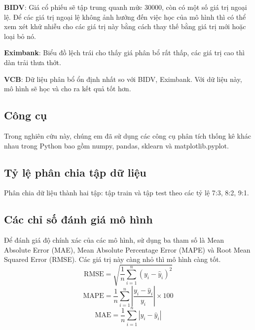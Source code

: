 \textbf{BIDV}: Giá cổ phiếu sẽ tập trung quanh mức 30000, còn có một số giá trị ngoại lệ. Để các giá trị ngoại lệ không ảnh hưởng đến việc học của mô hình thì có thể xem xét khử nhiễu cho các giá trị này bằng cách thay thế bằng giá trị mới hoặc loại bỏ nó.
\par
\textbf{Eximbank}: Biểu đồ lệch trái cho thấy giá phân bổ rất thấp, các giá trị cao thì dàn trải thưa thớt.
\par
\textbf{VCB}: Dữ liệu phân bổ ổn định nhất so với BIDV, Eximbank. Với dữ liệu này, mô hình sẽ học và cho ra kết quả tốt hơn.


\subsection{Công cụ}
Trong nghiên cứu này, chúng em đã sử dụng các công cụ phân tích thống kê khác nhau trong Python bao gồm numpy, pandas, sklearn và matplotlib.pyplot.

\subsection{Tỷ lệ phân chia tập dữ liệu}
Phân chia dữ liệu thành hai tập: tập train và tập test theo các tỷ lệ 7:3, 8:2, 9:1. %

\subsection{Các chỉ số đánh giá mô hình}
Để đánh giá độ chính xác của các mô hình, sử dụng ba tham số là Mean Absolute Error (MAE), Mean Absolute Percentage Error (MAPE) và Root Mean Squared Error (RMSE). Các giá trị này càng nhỏ thì mô hình càng tốt.
\[
\text{RMSE} = \sqrt{\frac{1}{n} \sum_{i=1}^{n} (y_i - \hat{y}_i)^2}
\]
\[
\text{MAPE} = \frac{1}{n} \sum_{i=1}^{n} \left| \frac{y_i - \hat{y}_i}{y_i} \right| \times 100
\]
\[
\text{MAE} = \frac{1}{n} \sum_{i=1}^{n} |y_i - \hat{y}_i|
\]